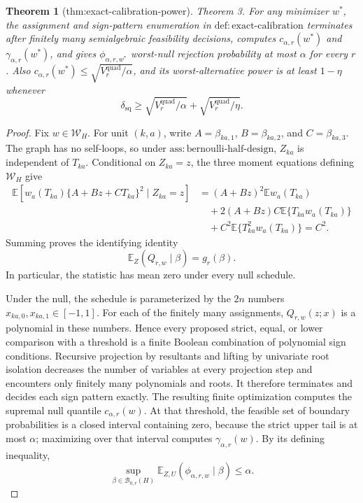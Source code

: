 \documentclass{article}
\newtheorem{theorem}{Theorem}
\begin{document}
\begin{theorem}[thm:exact-calibration-power]\label{thm:exact-calibration-power}
Theorem 3. For any minimizer \(w^*\), the assignment and sign-pattern enumeration in \(\mathrm{def:exact\text{-}calibration}\) terminates after finitely many semialgebraic feasibility decisions, computes \(c_{\alpha,r}(w^*)\) and \(\gamma_{\alpha,r}(w^*)\), and gives \(\phi_{\alpha,r,w^*}\) worst-null rejection probability at most \(\alpha\) for every \(r\). Also \(c_{\alpha,r}(w^*)\le\sqrt{V^{\mathrm{quad}}_r/\alpha}\), and its worst-alternative power is at least \(1-\eta\) whenever \[\delta_{\mathrm{sq}}\ge\sqrt{V^{\mathrm{quad}}_r/\alpha}+\sqrt{V^{\mathrm{quad}}_r/\eta}.\]
\end{theorem}
\begin{proof}
Fix \(w\in\mathcal W_H\).  For unit \((k,a)\), write \(A=\beta_{ka,1}\), \(B=\beta_{ka,2}\), and \(C=\beta_{ka,3}\).  The graph has no self-loops, so under \(\mathrm{ass:bernoulli\text{-}half\text{-}design}\), \(Z_{ka}\) is independent of \(T_{ka}\).  Conditional on \(Z_{ka}=z\), the three moment equations defining \(\mathcal W_H\) give
\[
\begin{aligned}
\mathbb E\left[w_a(T_{ka})\{A+Bz+CT_{ka}\}^2\mid Z_{ka}=z\right]
&=(A+Bz)^2\mathbb Ew_a(T_{ka})\\
&\quad+2(A+Bz)C\mathbb E\{T_{ka}w_a(T_{ka})\}\\
&\quad+C^2\mathbb E\{T_{ka}^2w_a(T_{ka})\}=C^2.
\end{aligned}
\]
Summing proves the identifying identity
\[
\mathbb E_Z(Q_{r,w}\mid\beta)=g_r(\beta). \tag{10}
\]
In particular, the statistic has mean zero under every null schedule.

Under the null, the schedule is parameterized by the \(2n\) numbers \(x_{ka,0},x_{ka,1}\in[-1,1]\).  For each of the finitely many assignments, \(Q_{r,w}(z;x)\) is a polynomial in these numbers.  Hence every proposed strict, equal, or lower comparison with a threshold is a finite Boolean combination of polynomial sign conditions.  Recursive projection by resultants and lifting by univariate root isolation decreases the number of variables at every projection step and encounters only finitely many polynomials and roots.  It therefore terminates and decides each sign pattern exactly.  The resulting finite optimization computes the supremal null quantile \(c_{\alpha,r}(w)\).  At that threshold, the feasible set of boundary probabilities is a closed interval containing zero, because the strict upper tail is at most \(\alpha\); maximizing over that interval computes \(\gamma_{\alpha,r}(w)\).  By its defining inequality,
\[
\sup_{\beta\in\mathcal B_{0,r}(H)}
\mathbb E_{Z,U}(\phi_{\alpha,r,w}\mid\beta)\le\alpha. \tag{11}
\]


\end{proof}
\end{document}
